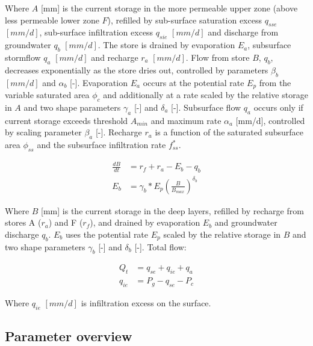 Where $A$ [mm] is the current storage in the more permeable upper zone (above less permeable lower zone $F$), refilled by sub-surface saturation excess $q_{sse}$ $[mm/d]$, sub-surface infiltration excess $q_{sie}$ $[mm/d]$ and discharge from groundwater $q_b$ $[mm/d]$. 
The store is drained by evaporation $E_a$, subsurface stormflow $q_a$ $[mm/d]$ and recharge $r_a$ $[mm/d]$.
Flow from store $B$, $q_b$, decreases exponentially as the store dries out, controlled by parameters $\beta_b$ $[mm/d]$ and $\alpha_b$ [-]. 
Evaporation $E_a$ occurs at the potential rate $E_p$ from the variable saturated area $\phi_c$ and additionally at a rate scaled by the relative storage in $A$ and two shape parameters $\gamma_a$ [-] and $\delta_a$ [-].
Subsurface flow $q_a$ occurs only if current storage exceeds threshold $A_{min}$ and maximum rate $\alpha_a$ [mm/d], controlled by scaling parameter $\beta_a$ [-].
Recharge $r_a$ is a function of the saturated subsurface area $\phi_{ss}$ and the subsurface infiltration rate $f_{ss}^*$.

\begin{align}
	\frac{dB}{dt} &= r_f+r_a - E_b - q_b \\
	E_b &= \gamma_b*E_p\left(\frac{B}{B_{max}}\right)^{\delta_b}
\end{align}
  
Where $B$ [mm] is the current storage in the deep layers, refilled by recharge from stores A ($r_a$) and F ($r_f$), and drained by evaporation $E_b$ and groundwater discharge $q_b$.
$E_b$ uses the potential rate $E_p$ scaled by the relative storage in $B$ and two shape parameters $\gamma_b$ [-] and $\delta_b$ [-].
Total flow:

\begin{align}
	Q_t &=q_{se}+q_{ie}+q_a \\
	q_{ie} &= P_g-q_{se}-P_c
\end{align}

Where $q_{ie}$  $[mm/d]$ is infiltration excess on the surface.

\newpage
\subsection{Parameter overview}


